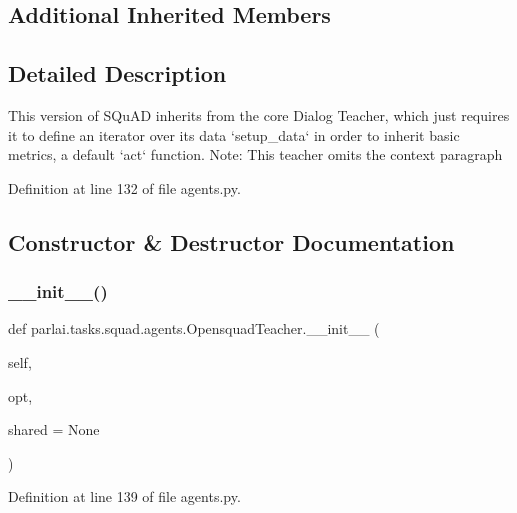 \subsection*{Additional Inherited Members}


\subsection{Detailed Description}
\begin{DoxyVerb}This version of SQuAD inherits from the core Dialog Teacher, which just
requires it to define an iterator over its data `setup_data` in order to
inherit basic metrics, a default `act` function.
Note: This teacher omits the context paragraph
\end{DoxyVerb}
 

Definition at line 132 of file agents.\+py.



\subsection{Constructor \& Destructor Documentation}
\mbox{\label{classparlai_1_1tasks_1_1squad_1_1agents_1_1OpensquadTeacher_a1b05b43517db8f76098f6901d2b7516b}} 
\subsubsection{\texorpdfstring{\+\_\+\+\_\+init\+\_\+\+\_\+()}{\_\_init\_\_()}}
{\footnotesize\ttfamily def parlai.\+tasks.\+squad.\+agents.\+Opensquad\+Teacher.\+\_\+\+\_\+init\+\_\+\+\_\+ (\begin{DoxyParamCaption}\item[{}]{self,  }\item[{}]{opt,  }\item[{}]{shared = {\ttfamily None} }\end{DoxyParamCaption})}



Definition at line 139 of file agents.\+py.



